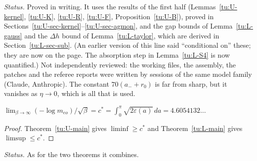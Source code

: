 \noindent\emph{Status.} Proved in writing. It uses the results of the first half (Lemmas~\ref{tu:U-kernel},
\ref{tu:U-K}, \ref{tu:U-R}, \ref{tu:U-F}, Proposition~\ref{tu:U-B}), proved in Sections~\ref{tu:U-sec-kernel}--\ref{tu:U-sec-agmon}, and the gap bounds of
Lemma~\ref{tu:L-gauss} and the $\Delta h$ bound of Lemma~\ref{tu:L-taylor}, which are derived in Section~\ref{tu:L-sec-sub}. (An earlier
version of this line said ``conditional on'' these; they are now on the page. The absorption step in Lemma~\ref{tu:L-S4} is now
quantified.) Not independently reviewed: the working files, the assembly, the patches and the referee reports were written by
sessions of the same model family (Claude, Anthropic). The constant $70(a_-+r_0)$ is far
from sharp, but it vanishes as $\eta\to0$, which is all that is used.

\begin{corollary}\label{tu:L-limit}
$\lim_{\beta\to\infty}(-\log m_{eo})/\sqrt\beta=c^*=\int_0^\pi\sqrt{2\varepsilon(a)}\,da=4.6054132\ldots$
\end{corollary}

\begin{proof}
Theorem~\ref{tu:U-main} gives $\liminf\ge c^*$ and Theorem~\ref{tu:L-main} gives $\limsup\le c^*$.
\end{proof}

\noindent\emph{Status.} As for the two theorems it combines.
